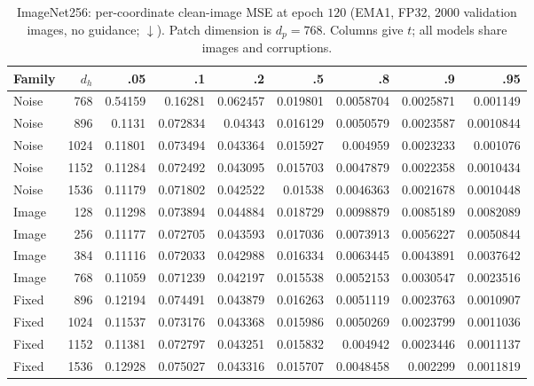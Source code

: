 \begin{table}[H]
\centering
\caption{ImageNet256: per-coordinate clean-image MSE at epoch $120$ (EMA1, FP32, $2000$ validation images, no guidance; $\downarrow$). Patch dimension is $d_p=768$. Columns give $t$; all models share images and corruptions.}
\label{tab:width-loss-grid-256}
\small
\setlength{\tabcolsep}{3pt}
\begin{tabular}{lrrrrrrrr}
\toprule
Family & $d_h$ & .05 & .1 & .2 & .5 & .8 & .9 & .95\\
\midrule
Noise & 768 & 0.54159 & 0.16281 & 0.062457 & 0.019801 & 0.0058704 & 0.0025871 & 0.001149\\
Noise & 896 & 0.1131 & 0.072834 & 0.04343 & 0.016129 & 0.0050579 & 0.0023587 & 0.0010844\\
Noise & 1024 & 0.11801 & 0.073494 & 0.043364 & 0.015927 & 0.004959 & 0.0023233 & 0.001076\\
Noise & 1152 & 0.11284 & 0.072492 & 0.043095 & 0.015703 & 0.0047879 & 0.0022358 & 0.0010434\\
Noise & 1536 & 0.11179 & 0.071802 & 0.042522 & 0.01538 & 0.0046363 & 0.0021678 & 0.0010448\\
Image & 128 & 0.11298 & 0.073894 & 0.044884 & 0.018729 & 0.0098879 & 0.0085189 & 0.0082089\\
Image & 256 & 0.11177 & 0.072705 & 0.043593 & 0.017036 & 0.0073913 & 0.0056227 & 0.0050844\\
Image & 384 & 0.11116 & 0.072033 & 0.042988 & 0.016334 & 0.0063445 & 0.0043891 & 0.0037642\\
Image & 768 & 0.11059 & 0.071239 & 0.042197 & 0.015538 & 0.0052153 & 0.0030547 & 0.0023516\\
Fixed & 896 & 0.12194 & 0.074491 & 0.043879 & 0.016263 & 0.0051119 & 0.0023763 & 0.0010907\\
Fixed & 1024 & 0.11537 & 0.073176 & 0.043368 & 0.015986 & 0.0050269 & 0.0023799 & 0.0011036\\
Fixed & 1152 & 0.11381 & 0.072797 & 0.043251 & 0.015832 & 0.004942 & 0.0023446 & 0.0011137\\
Fixed & 1536 & 0.12928 & 0.075027 & 0.043316 & 0.015707 & 0.0048458 & 0.002299 & 0.0011819\\
\bottomrule
\end{tabular}
\end{table}
